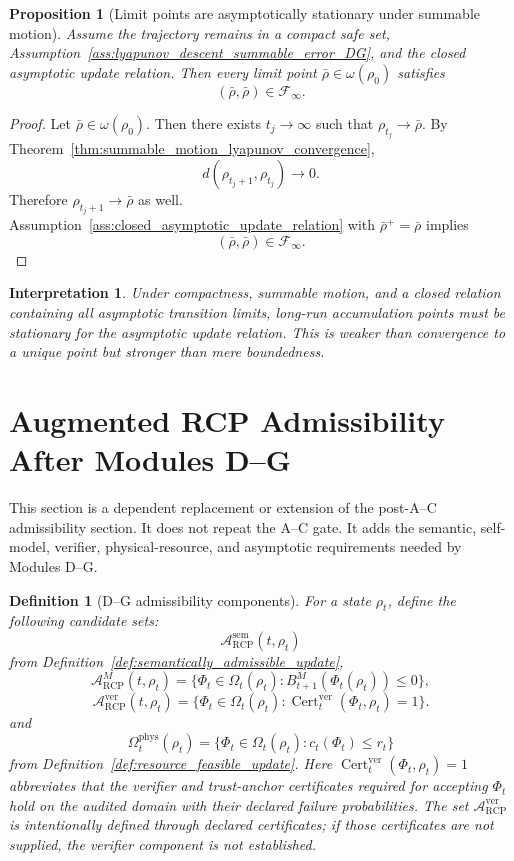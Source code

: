 \documentclass[11pt]{article}
\newtheorem{proposition}[theorem]{Proposition}
\newtheorem{definition}[theorem]{Definition}
\newtheorem{interpretation}[theorem]{Interpretation}
\newcommand{\Acal}{\mathcal{A}}
\newcommand{\Fcal}{\mathcal{F}}
\newcommand{\1}{\mathbf{1}}
\newcommand{\RCP}{\mathrm{RCP}}
\newcommand{\Cert}{\operatorname{Cert}}
\providecommand{\sem}{\mathrm{sem}}
\providecommand{\phys}{\mathrm{phys}}
\providecommand{\ver}{\mathrm{ver}}
\begin{document}
\begin{proposition}[Limit points are asymptotically stationary under summable motion]
\label{prop:limit_points_asymptotically_stationary}
Assume the trajectory remains in a compact safe set, Assumption~\ref{ass:lyapunov_descent_summable_error_DG}, and the closed asymptotic update relation.  Then every limit point \(\bar\rho\in\omega(\rho_0)\) satisfies
\[
(\bar\rho,\bar\rho)\in\Fcal_\infty.
\]
\end{proposition}

\begin{proof}
Let \(\bar\rho\in\omega(\rho_0)\).  Then there exists \(t_j\to\infty\) such that \(\rho_{t_j}\to\bar\rho\).  By Theorem~\ref{thm:summable_motion_lyapunov_convergence},
\[
d(\rho_{t_j+1},\rho_{t_j})\to0.
\]
Therefore \(\rho_{t_j+1}\to\bar\rho\) as well.  Assumption~\ref{ass:closed_asymptotic_update_relation} with \(\bar\rho^+=\bar\rho\) implies
\[
(\bar\rho,\bar\rho)\in\Fcal_\infty.
\]
\end{proof}

\begin{interpretation}
Under compactness, summable motion, and a closed relation containing all asymptotic transition limits, long-run accumulation points must be stationary for the asymptotic update relation.  This is weaker than convergence to a unique point but stronger than mere boundedness.
\end{interpretation}

\section{Augmented RCP Admissibility After Modules D--G}
\label{sec:augmented_rcp_admissibility_D_G}

This section is a dependent replacement or extension of the post-A--C admissibility section.  It does not repeat the A--C gate.  It adds the semantic, self-model, verifier, physical-resource, and asymptotic requirements needed by Modules D--G.

\begin{definition}[D--G admissibility components]
\label{def:D_G_admissibility_components}
For a state \(\rho_t\), define the following candidate sets:
\[
\Acal^{\sem}_{\RCP}(t,\rho_t)
\]
from Definition~\ref{def:semantically_admissible_update},
\[
\Acal^{M}_{\RCP}(t,\rho_t)
=
\{\Phi_t\in\Omega_t(\rho_t):B^M_{t+1}(\Phi_t(\rho_t))\le0\},
\]
\[
\Acal^{\ver}_{\RCP}(t,\rho_t)
=
\{\Phi_t\in\Omega_t(\rho_t):\Cert_t^{\ver}(\Phi_t,\rho_t)=1\}.
\]
and
\[
\Omega_t^{\phys}(\rho_t)
=
\{\Phi_t\in\Omega_t(\rho_t):c_t(\Phi_t)\le r_t\}
\]
from Definition~\ref{def:resource_feasible_update}.  Here \(\Cert_t^{\ver}(\Phi_t,\rho_t)=1\) abbreviates that the verifier and trust-anchor certificates required for accepting \(\Phi_t\) hold on the audited domain with their declared failure probabilities.  The set \(\Acal^{\ver}_{\RCP}\) is intentionally defined through declared certificates; if those certificates are not supplied, the verifier component is not established.
\end{definition}
\end{document}
